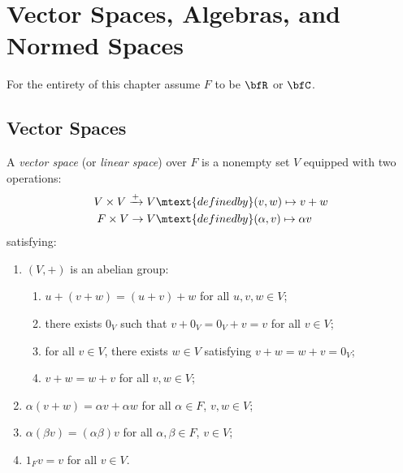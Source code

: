 \chapter{Vector Spaces, Algebras, and Normed Spaces}

\noindent For the entirety of this chapter assume $F$ to be  $\bfR$ or $\bfC$.

\section{Vector Spaces}
    \begin{definition}
        A \textit{vector space} (or \textit{linear space}) over $F$ is a nonempty set $V$ equipped with two operations:
            \begin{equation*}
            \begin{split}
                V \times V \xrightarrow{+} V &\mtext{defined by} (v,w) \mapsto v+w \\
                F \times V \rightarrow V &\mtext{defined by} (\alpha,v) \mapsto \alpha v
            \end{split}
            \end{equation*}
        satisfying:
            \begin{enumerate}[label = (\arabic*),itemsep=1pt,topsep=3pt]
                \item $(V, +)$ is an abelian group:
                    \begin{enumerate}[label = (\roman*),itemsep=1pt,topsep=3pt]
                        \item $u + (v+w) = (u+v) + w$ for all $u,v,w \in V$;
                        \item there exists $0_V$ such that $v + 0_V = 0_V + v = v$ for all $v \in V$;
                        \item for all $v \in V$, there exists $w \in V$ satisfying $v+w = w+v = 0_V$;
                        \item $v + w = w+v$ for all $v,w \in V$;
                    \end{enumerate}

                \item $\alpha(v+w) = \alpha v + \alpha w$ for all $\alpha \in F$, $v,w \in V$;
                \item $\alpha(\beta v) = (\alpha \beta)v$ for all $\alpha,\beta \in F$, $v \in V$;
                \item $1_F v = v$ for all $v \in V$.
            \end{enumerate}
    \end{definition}

